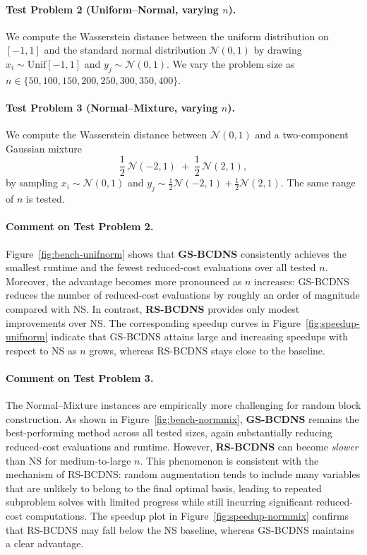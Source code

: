 \documentclass[12pt,a4paper]{article}
\begin{document}
\paragraph{Test Problem 2 (Uniform--Normal, varying $n$).}
We compute the Wasserstein distance between the uniform distribution on $[-1,1]$
and the standard normal distribution $\mathcal N(0,1)$ by drawing
$x_i \sim \mathrm{Unif}[-1,1]$ and $y_j \sim \mathcal N(0,1)$.
We vary the problem size as $n\in\{50,100,150,200,250,300,350,400\}$. 

\paragraph{Test Problem 3 (Normal--Mixture, varying $n$).}
We compute the Wasserstein distance between $\mathcal N(0,1)$ and a two-component
Gaussian mixture
\[
\frac{1}{2}\,\mathcal N(-2,1) \;+\; \frac{1}{2}\,\mathcal N(2,1),
\]
by sampling $x_i\sim \mathcal N(0,1)$ and
$y_j \sim \frac{1}{2}\mathcal N(-2,1)+\frac{1}{2}\mathcal N(2,1)$.
The same range of $n$ is tested.


\paragraph{Comment on Test Problem 2.}
Figure~\ref{fig:bench-unifnorm} shows that \textbf{GS-BCDNS} consistently achieves the
smallest runtime and the fewest reduced-cost evaluations over all tested $n$.
Moreover, the advantage becomes more pronounced as $n$ increases:
GS-BCDNS reduces the number of reduced-cost evaluations by roughly an order of magnitude compared with NS.
In contrast, \textbf{RS-BCDNS} provides only modest improvements over NS.
The corresponding speedup curves in Figure~\ref{fig:speedup-unifnorm} indicate that
GS-BCDNS attains large and increasing speedups with respect to NS as $n$ grows,
whereas RS-BCDNS stays close to the baseline.

\paragraph{Comment on Test Problem 3.}
The Normal--Mixture instances are empirically more challenging for random block construction.
As shown in Figure~\ref{fig:bench-normmix}, \textbf{GS-BCDNS} remains the best-performing
method across all tested sizes, again substantially reducing reduced-cost evaluations and runtime.
However, \textbf{RS-BCDNS} can become \emph{slower} than NS for medium-to-large $n$.
This phenomenon is consistent with the mechanism of RS-BCDNS: random augmentation tends to
include many variables that are unlikely to belong to the final optimal basis, leading to repeated
subproblem solves with limited progress while still incurring significant reduced-cost computations.
The speedup plot in Figure~\ref{fig:speedup-normmix} confirms that RS-BCDNS may fall below
the NS baseline, whereas GS-BCDNS maintains a clear advantage.
\end{document}
